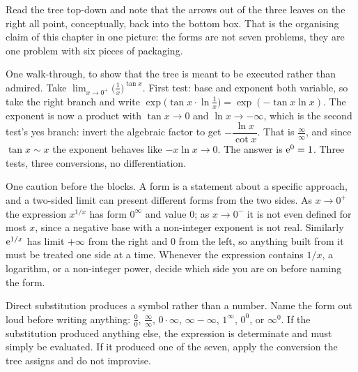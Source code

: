 Read the tree top-down and note that the arrows out of the three leaves on the right all point, conceptually, back into the bottom box. That is the organising claim of this chapter in one picture: the forms are not seven problems, they are one problem with six pieces of packaging.

One walk-through, to show that the tree is meant to be executed rather than admired. Take $\displaystyle\lim_{x\to0^{+}}\bigl(\tfrac1x\bigr)^{\tan x}$. First test: base and exponent both variable, so take the right branch and write $\exp\bigl(\tan x\cdot\ln\tfrac1x\bigr)=\exp(-\tan x\ln x)$. The exponent is now a product with $\tan x\to0$ and $\ln x\to-\infty$, which is the second test's yes branch: invert the algebraic factor to get $-\dfrac{\ln x}{\cot x}$. That is $\tfrac{\infty}{\infty}$, and since $\tan x\sim x$ the exponent behaves like $-x\ln x\to0$. The answer is $\mathrm{e}^{0}=1$. Three tests, three conversions, no differentiation.

One caution before the blocks. A form is a statement about a specific approach, and a two-sided limit can present different forms from the two sides. As $x\to0^{+}$ the expression $x^{1/x}$ has form $0^{\infty}$ and value $0$; as $x\to0^{-}$ it is not even defined for most $x$, since a negative base with a non-integer exponent is not real. Similarly $\mathrm{e}^{1/x}$ has limit $+\infty$ from the right and $0$ from the left, so anything built from it must be treated one side at a time. Whenever the expression contains $1/x$, a logarithm, or a non-integer power, decide which side you are on before naming the form.

\cue Direct substitution produces a symbol rather than a number.
\method Name the form out loud before writing anything: $\tfrac00$, $\tfrac{\infty}{\infty}$, $0\cdot\infty$, $\infty-\infty$, $1^{\infty}$, $0^{0}$, or $\infty^{0}$. If the substitution produced anything else, the expression is determinate and must simply be evaluated. If it produced one of the seven, apply the conversion the tree assigns and do not improvise.

